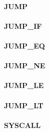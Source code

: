 \documentclass[12pt,a4paper]{article}
\begin{document}
\vspace{2em}\begin{minipage}{\textwidth}
\paragraph{JUMP}
\end{minipage}

\vspace{2em}\begin{minipage}{\textwidth}
\paragraph{JUMP\_IF}
\end{minipage}

\vspace{2em}\begin{minipage}{\textwidth}
\paragraph{JUMP\_EQ}
\end{minipage}

\vspace{2em}\begin{minipage}{\textwidth}
\paragraph{JUMP\_NE}
\end{minipage}

\vspace{2em}\begin{minipage}{\textwidth}
\paragraph{JUMP\_LE}
\end{minipage}

\vspace{2em}\begin{minipage}{\textwidth}
\paragraph{JUMP\_LT}
\end{minipage}

\vspace{2em}\begin{minipage}{\textwidth}
\paragraph{SYSCALL}
\end{minipage}
\end{document}

